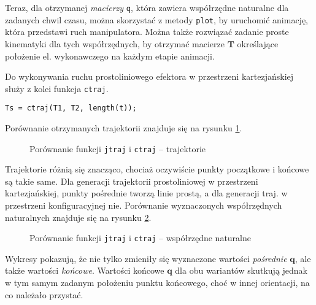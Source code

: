 \documentclass[11pt, a4paper]{article}
\newcommand{\vectorQ}{$\mathbf{q}$}
\newcommand{\matrixT}{$\mathbf{T}$}
\begin{document}
Teraz, dla otrzymanej \emph{macierzy} \texttt{q}, która zawiera współrzędne naturalne dla zadanych chwil czasu, można skorzystać z metody \texttt{plot}, by uruchomić animację, która przedstawi ruch manipulatora. Można także rozwiązać zadanie proste kinematyki dla tych współrzędnych, by otrzymać macierze \matrixT{} określające położenie el. wykonawczego na każdym etapie animacji.

Do wykonywania ruchu prostoliniowego efektora w przestrzeni kartezjańskiej służy z kolei funkcja \texttt{ctraj}.
\begin{lstlisting}
Ts = ctraj(T1, T2, length(t));
\end{lstlisting}

Porównanie otrzymanych trajektorii znajduje się na rysunku \ref{fig:traj}.
\begin{figure}[htbp!]
	\centering
	
	\hfill%
	
	\caption{Porównanie funkcji \texttt{jtraj} i \texttt{ctraj} -- trajektorie \label{fig:traj}}
\end{figure}

Trajektorie różnią się znacząco, chociaż oczywiście punkty początkowe i końcowe są takie same. Dla generacji trajektorii prostoliniowej w przestrzeni kartezjańskiej, punkty pośrednie tworzą linie prostą, a dla generacji traj. w przestrzeni konfiguracyjnej nie. Porównanie wyznaczonych współrzędnych naturalnych znajduje się na rysunku \ref{fig:trajQ}.
\begin{figure}[htbp!]
	\centering
	
	\hfill%
	
	\caption{Porównanie funkcji \texttt{jtraj} i \texttt{ctraj} -- współrzędne naturalne \label{fig:trajQ}}
\end{figure}

Wykresy pokazują, że nie tylko zmieniły się wyznaczone wartości \emph{pośrednie} \vectorQ{}, ale także wartości \emph{końcowe}. Wartości końcowe \vectorQ{} dla obu wariantów skutkują jednak w tym samym zadanym położeniu punktu końcowego, choć w innej orientacji, na co należało przystać.
\end{document}
